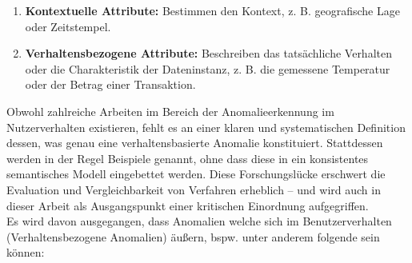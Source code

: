 \documentclass[a4paper,12pt]{article}
\begin{document}
	\begin{enumerate}
		\item \textbf{Kontextuelle Attribute:} Bestimmen den Kontext, z. B. geografische Lage oder Zeitstempel.
		\item \textbf{Verhaltensbezogene Attribute:} Beschreiben das tatsächliche Verhalten oder die Charakteristik der Dateninstanz, z. B. die gemessene Temperatur oder der Betrag einer Transaktion.
	\end{enumerate}
	Obwohl zahlreiche Arbeiten im Bereich der Anomalieerkennung im Nutzerverhalten existieren, fehlt es an einer klaren und systematischen Definition dessen, was genau eine verhaltensbasierte Anomalie konstituiert. Stattdessen werden in der Regel Beispiele genannt, ohne dass diese in ein konsistentes semantisches Modell eingebettet werden. Diese Forschungslücke erschwert die Evaluation und Vergleichbarkeit von Verfahren erheblich – und wird auch in dieser Arbeit als Ausgangspunkt einer kritischen Einordnung aufgegriffen.
	\\[0.5em]
	Es wird davon ausgegangen, dass Anomalien welche sich im Benutzerverhalten (Verhaltensbezogene Anomalien) äußern, bspw. unter anderem folgende sein können:
	
\end{document}
